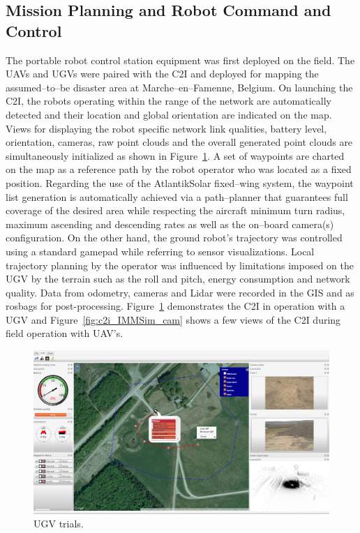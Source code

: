 \documentclass{article}
\begin{document}
\subsection{Mission Planning and Robot Command and Control}\label{mission_planning}

The portable robot control station equipment was first deployed on the field.
The UAVs and UGVs were paired with the C2I and deployed for mapping the assumed--to--be disaster area at Marche--en--Famenne, Belgium.
On launching the C2I, the robots operating within the range of the network are automatically detected and their location and global orientation are indicated on the map.
Views for displaying the robot specific network link qualities, battery level, orientation, cameras, raw point clouds and the overall generated point clouds are simultaneously initialized as shown in Figure~\ref{fig:c2i_ugv_trials}.
A set of waypoints are charted on the map as a reference path by the robot operator who was located as a fixed position. Regarding the use of the AtlantikSolar fixed--wing system, the waypoint list generation is automatically achieved via a path--planner that guarantees full coverage of the desired area while respecting the aircraft minimum turn radius, maximum ascending and descending rates as well as the on--board camera(s) configuration.
On the other hand, the ground robot’s trajectory was controlled using a standard gamepad while referring to sensor visualizations.
Local trajectory planning by the operator was influenced by limitations imposed on the UGV by the terrain such as the roll and pitch, energy consumption and network quality.
Data from odometry, cameras and Lidar were recorded in the GIS and as rosbags for post-processing. Figure~\ref{fig:c2i_ugv_trials} demonstrates the C2I in operation with a UGV and Figure~\ref{fig:c2i_IMMSim_cam} shows a few views of the C2I during field operation with UAV's.
\begin{figure}
    \centering
    \includegraphics[width=\textwidth]{ROB-15-0035_fig20.png}
    \caption{UGV trials.}
    \label{fig:c2i_ugv_trials}
\end{figure}
\end{document}

